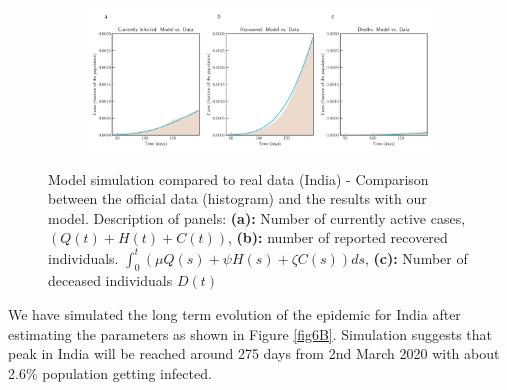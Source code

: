 \documentclass[fleqn,10pt]{wlscirep}
\begin{document}
\begin{figure}[t!]
	\centering
	\begin{subfigure}[b]{\textwidth}
		\centering
		\includegraphics[width=1\linewidth]{India_plot_model_data.pdf}
	\end{subfigure}
	\caption{Model simulation compared to real data (India) - Comparison between the official data (histogram) and the results with our model. Description of panels: \textbf{(a):} Number of currently active cases, $\left( Q(t) + H(t) + C(t)\right)$, \textbf{(b):} number of reported recovered individuals. $\int_{0}^{t}{\left( \mu Q(s) + \psi H(s) + \zeta  C(s) \right) ds}$, \textbf{(c):} Number of deceased individuals $D(t)$}
	\label{fig6A} 
\end{figure}

We have simulated the long term evolution of the epidemic for India after estimating the parameters as shown in Figure \ref{fig6B}. Simulation suggests that peak in India will be reached around 275 days from 2nd March 2020 with about 2.6\% population getting infected. 
\end{document}

